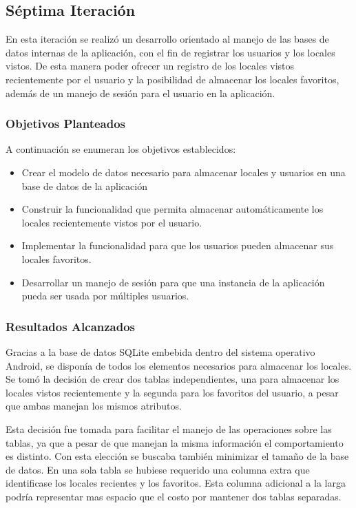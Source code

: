 \subsection{Séptima Iteración}

En esta iteración se realizó un desarrollo orientado al manejo de las bases de datos internas de la aplicación, con el fin de registrar los usuarios y los locales vistos. De esta manera poder ofrecer un registro de los locales vistos recientemente por el usuario y la posibilidad de almacenar los locales favoritos, además de un manejo de sesión para el usuario en la aplicación.

\subsubsection{Objetivos Planteados} 
A continuación se enumeran los objetivos establecidos:
\begin{itemize}
\item Crear el modelo de datos necesario para almacenar locales y usuarios en una base de datos de la aplicación
\item Construir la funcionalidad que permita almacenar automáticamente los locales recientemente vistos por el usuario.
\item Implementar la funcionalidad para que los usuarios pueden almacenar sus locales favoritos.
\item Desarrollar un manejo de sesión para que una instancia de la aplicación pueda ser usada por múltiples usuarios. 
\end{itemize}

\subsubsection{Resultados Alcanzados}

Gracias a la base de datos SQLite embebida dentro del sistema operativo Android, se disponía de todos los elementos necesarios para almacenar los locales. Se tomó la decisión de crear dos tablas independientes, una para almacenar los locales vistos recientemente y la segunda para los favoritos del usuario, a pesar que ambas manejan los mismos atributos.

Esta decisión fue tomada para facilitar el manejo de las operaciones sobre las tablas, ya que a pesar de que manejan la misma información el comportamiento es distinto. Con esta elección se buscaba también minimizar el tamaño de la base de datos. En una sola tabla se hubiese requerido una columna extra que identificase los locales recientes y los favoritos. Esta columna adicional a la larga podría representar mas espacio que el costo por mantener dos tablas separadas.

